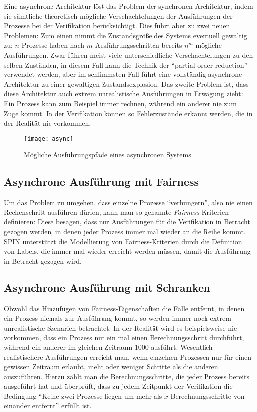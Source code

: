 Eine asynchrone Architektur löst das Problem der synchronen Architektur, indem sie sämtliche theoretisch mögliche Verschachtelungen der Ausführungen der Prozesse bei der Verifikation berücksichtigt.
Dies führt aber zu zwei neuen Problemen:
Zum einen nimmt die Zustandsgröße des Systems eventuell gewaltig zu; $n$ Prozesse haben nach $m$ Ausführungsschritten bereits $n^m$ mögliche Ausführungen.
Zwar führen meist viele unterschiedliche Verschachtelungen zu den selben Zuständen, in diesem Fall kann die Technik der "`partial order reduction"'\cite{partial_order_reduction} verwendet werden, aber im schlimmsten Fall führt eine vollständig asynchrone Architektur zu einer gewaltigen Zustandsexplosion.
Das zweite Problem ist, dass diese Architektur auch extrem unrealistische Ausführungen in Erwägung zieht:
Ein Prozess kann zum Beispiel immer rechnen, während ein anderer nie zum Zuge kommt.
In der Verifikation können so Fehlerzustände erkannt werden, die in der Realität nie vorkommen.

\begin{figure}[h]
  \centering
  \texttt{[image: async]}
  \caption{Mögliche Ausführungspfade eines asynchronen Systems}
  \label{fig:asynchronous_paths}
\end{figure}
\subsection{Asynchrone Ausführung mit Fairness}
Um das Problem zu umgehen, dass einzelne Prozesse "`verhungern"', also nie einen Rechenschritt ausführen dürfen, kann man so genannte \emph{Fairness}-Kriterien definieren:
Diese besagen, dass nur Ausführungen für die Verifikation in Betracht gezogen werden, in denen jeder Prozess immer mal wieder an die Reihe kommt.
SPIN unterstützt die Modellierung von Fairness-Kriterien durch die Definition von Labels, die immer mal wieder erreicht werden müssen, damit die Ausführung in Betracht gezogen wird.
\subsection{Asynchrone Ausführung mit Schranken}
Obwohl das Hinzufügen von Fairness-Eigenschaften die Fälle entfernt, in denen ein Prozess niemals zur Ausführung kommt, so werden immer noch extrem unrealistische Szenarien betrachtet:
In der Realität wird es beispielsweise nie vorkommen, dass ein Prozess nur ein mal einen Berechnungsschritt durchführt, während ein anderer im gleichen Zeitraum 1000 ausführt.
Wesentlich realistischere Ausführungen erreicht man, wenn einzelnen Prozessen nur für einen gewissen Zeitraum erlaubt, mehr oder weniger Schritte als die anderen auszuführen.
Hierzu zählt man die Berechnungsschritte, die jeder Prozess bereits ausgeführt hat und überprüft, dass zu jedem Zeitpunkt der Verifikation die Bedingung "`Keine zwei Prozesse liegen um mehr als $x$ Berechnungsschritte von einander entfernt"' erfüllt ist.
